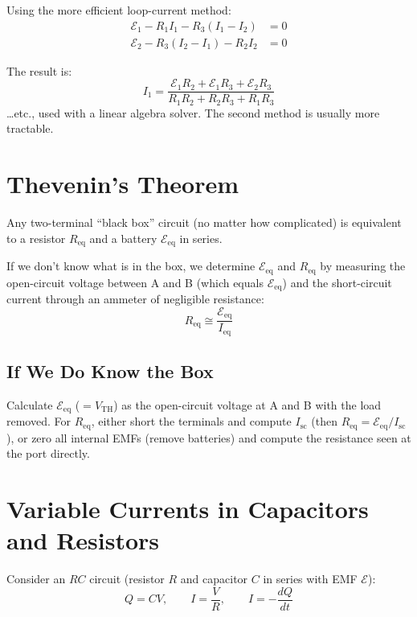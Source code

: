 Using the more efficient loop-current method:
\begin{align*}
    \mathcal{E}_1 - R_1 I_1 - R_3(I_1 - I_2) &= 0 \\
    \mathcal{E}_2 - R_3(I_2 - I_1) - R_2 I_2 &= 0
\end{align*}

The result is:
\[
    I_1 = \frac{\mathcal{E}_1 R_2 + \mathcal{E}_1 R_3 + \mathcal{E}_2 R_3}{R_1 R_2 + R_2 R_3 + R_1 R_3}
\]
\ldots etc., used with a linear algebra solver. The second method is usually more tractable.

\section{Thevenin's Theorem}

\begin{theorem}
Any two-terminal ``black box'' circuit (no matter how complicated) is equivalent to a resistor $R_\text{eq}$ and a battery $\mathcal{E}_\text{eq}$ in series.
\end{theorem}

If we don't know what is in the box, we determine $\mathcal{E}_\text{eq}$ and $R_\text{eq}$ by measuring the open-circuit voltage between A and B (which equals $\mathcal{E}_\text{eq}$) and the short-circuit current through an ammeter of negligible resistance:
\[
    \boxed{R_\text{eq} \cong \frac{\mathcal{E}_\text{eq}}{I_\text{eq}}}
\]

\subsection{If We Do Know the Box}

Calculate $\mathcal{E}_\text{eq}$ ($= V_\text{TH}$) as the open-circuit voltage at A and B with the load removed. For $R_\text{eq}$, either short the terminals and compute $I_\text{sc}$ (then $R_\text{eq} = \mathcal{E}_\text{eq}/I_\text{sc}$), or zero all internal EMFs (remove batteries) and compute the resistance seen at the port directly.

\section{Variable Currents in Capacitors and Resistors}

Consider an $RC$ circuit (resistor $R$ and capacitor $C$ in series with EMF $\mathcal{E}$):
\[
    Q = CV, \qquad I = \frac{V}{R}, \qquad I = -\frac{dQ}{dt}
\]

